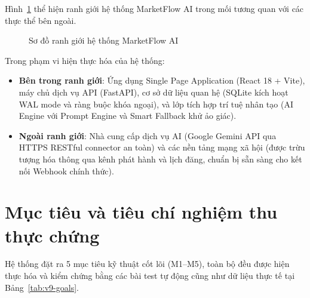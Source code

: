 Hình~\ref{fig:v8-context} thể hiện ranh giới hệ thống MarketFlow AI trong mối tương quan với các thực thể bên ngoài.

\begin{figure}[H]
\centering
\vspace{2pt}

\vspace{2pt}
\caption{Sơ đồ ranh giới hệ thống MarketFlow AI}
\label{fig:v8-context}
\end{figure}

Trong phạm vi hiện thực hóa của hệ thống:
\begin{itemize}[noitemsep,topsep=2pt]
  \item \textbf{Bên trong ranh giới}: Ứng dụng Single Page Application (React 18 + Vite), máy chủ dịch vụ API (FastAPI), cơ sở dữ liệu quan hệ (SQLite kích hoạt WAL mode và ràng buộc khóa ngoại), và lớp tích hợp trí tuệ nhân tạo (AI Engine với Prompt Engine và Smart Fallback khử ảo giác).
  \item \textbf{Ngoài ranh giới}: Nhà cung cấp dịch vụ AI (Google Gemini API qua HTTPS RESTful connector an toàn) và các nền tảng mạng xã hội (được trừu tượng hóa thông qua kênh phát hành và lịch đăng, chuẩn bị sẵn sàng cho kết nối Webhook chính thức).
\end{itemize}

\section{Mục tiêu và tiêu chí nghiệm thu thực chứng}

Hệ thống đặt ra 5 mục tiêu kỹ thuật cốt lõi (M1--M5), toàn bộ đều được hiện thực hóa và kiểm chứng bằng các bài test tự động cũng như dữ liệu thực tế tại Bảng~\ref{tab:v9-goals}.


